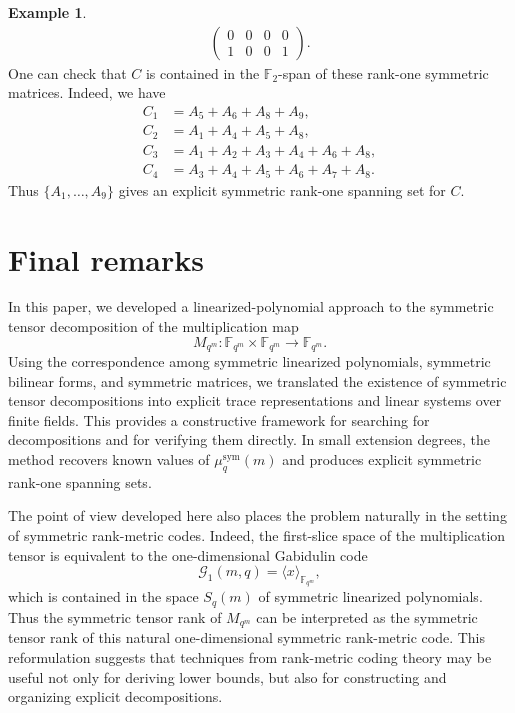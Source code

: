 \documentclass[11pt,a4paper,reqno]{article}
\numberwithin{equation}{section}
\theoremstyle{definition}
\newtheorem{example}[theorem]{Example}
\begin{document}
\begin{example}
\begin{equation*}
\begin{array}{ccc}
\begin{pmatrix}
0 & 0 & 0 & 0\\
1 & 0 & 0 & 1
\end{pmatrix}.
\end{array}
\end{equation*}
One can check that \(C\) is contained in the \(\mathbb F_2\)-span of these
rank-one symmetric matrices. Indeed, we have 
\begin{align*}
    C_1&=A_5+A_6+A_8+A_9,\\
    C_2&=A_1+A_4+A_5+A_8,\\
    C_3&=A_1+A_2+A_3+A_4+A_6+A_8,\\
    C_4&=A_3+A_4+A_5+A_6+A_7+A_8.
\end{align*}
Thus \(\{A_1,\ldots,A_9\}\) gives an explicit symmetric rank-one spanning set
for \(C\).
\end{example}

\section{Final remarks}

In this paper, we developed a linearized-polynomial approach to the
symmetric tensor decomposition of the multiplication map
\[
M_{q^m}:\mathbb F_{q^m}\times \mathbb F_{q^m}\to \mathbb F_{q^m}.
\]
Using the correspondence among symmetric linearized polynomials,
symmetric bilinear forms, and symmetric matrices, we translated the
existence of symmetric tensor decompositions into explicit trace
representations and linear systems over finite fields. This provides a
constructive framework for searching for decompositions and for verifying
them directly. In small extension degrees, the method recovers known
values of \(\mu_q^{\mathrm{sym}}(m)\) and produces explicit symmetric
rank-one spanning sets.

The point of view developed here also places the problem naturally in the
setting of symmetric rank-metric codes. Indeed, the first-slice space of
the multiplication tensor is equivalent to the one-dimensional Gabidulin
code
\[
\mathcal{G}_1(m,q)=\langle x\rangle_{\mathbb F_{q^m}},
\]
which is contained in the space \(S_q(m)\) of symmetric linearized
polynomials. Thus the symmetric tensor rank of \(M_{q^m}\) can be
interpreted as the symmetric tensor rank of this natural one-dimensional
symmetric rank-metric code. This reformulation suggests that techniques
from rank-metric coding theory may be useful not only for deriving lower
bounds, but also for constructing and organizing explicit decompositions.
\end{document}
